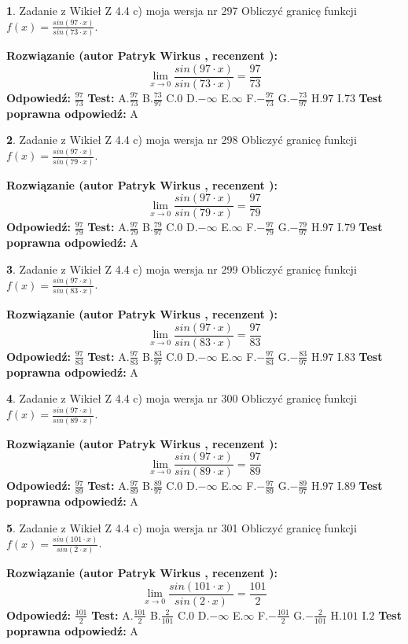 \documentclass[12pt, a4paper]{article}
\theoremstyle{definition} %
\newtheorem{zad}{}
\newcommand{\zadStart}[1]{\begin{zad}#1\newline}
\newcommand{\zadStop}{\end{zad}}
\newcommand{\rozwStart}[2]{\noindent \textbf{Rozwiązanie (autor #1 , recenzent #2): }\newline}
\newcommand{\rozwStop}{\newline}
\newcommand{\odpStart}{\noindent \textbf{Odpowiedź:}\newline}
\newcommand{\odpStop}{\newline}
\newcommand{\testStart}{\noindent \textbf{Test:}\newline}
\newcommand{\testStop}{\newline}
\newcommand{\kluczStart}{\noindent \textbf{Test poprawna odpowiedź:}\newline}
\newcommand{\kluczStop}{\newline}
\begin{document}
\zadStart{Zadanie z Wikieł Z 4.4 c) moja wersja nr 297}
Obliczyć granicę funkcji $f(x)=\frac{sin(97\cdot x)}{sin(73\cdot x)}$.
\zadStop
\rozwStart{Patryk Wirkus}{}
$$\lim\limits_{x\to 0}\frac{sin(97\cdot x)}{sin(73\cdot x)}=
\frac{97}{73}$$
\rozwStop
\odpStart
$\frac{97}{73}$
\odpStop
\testStart
A.$\frac{97}{73}$
B.$\frac{73}{97}$
C.$0$
D.$-\infty$
E.$\infty$
F.$-\frac{97}{73}$
G.$-\frac{73}{97}$
H.$97$
I.$73$
\testStop
\kluczStart
A
\kluczStop



\zadStart{Zadanie z Wikieł Z 4.4 c) moja wersja nr 298}
Obliczyć granicę funkcji $f(x)=\frac{sin(97\cdot x)}{sin(79\cdot x)}$.
\zadStop
\rozwStart{Patryk Wirkus}{}
$$\lim\limits_{x\to 0}\frac{sin(97\cdot x)}{sin(79\cdot x)}=
\frac{97}{79}$$
\rozwStop
\odpStart
$\frac{97}{79}$
\odpStop
\testStart
A.$\frac{97}{79}$
B.$\frac{79}{97}$
C.$0$
D.$-\infty$
E.$\infty$
F.$-\frac{97}{79}$
G.$-\frac{79}{97}$
H.$97$
I.$79$
\testStop
\kluczStart
A
\kluczStop



\zadStart{Zadanie z Wikieł Z 4.4 c) moja wersja nr 299}
Obliczyć granicę funkcji $f(x)=\frac{sin(97\cdot x)}{sin(83\cdot x)}$.
\zadStop
\rozwStart{Patryk Wirkus}{}
$$\lim\limits_{x\to 0}\frac{sin(97\cdot x)}{sin(83\cdot x)}=
\frac{97}{83}$$
\rozwStop
\odpStart
$\frac{97}{83}$
\odpStop
\testStart
A.$\frac{97}{83}$
B.$\frac{83}{97}$
C.$0$
D.$-\infty$
E.$\infty$
F.$-\frac{97}{83}$
G.$-\frac{83}{97}$
H.$97$
I.$83$
\testStop
\kluczStart
A
\kluczStop



\zadStart{Zadanie z Wikieł Z 4.4 c) moja wersja nr 300}
Obliczyć granicę funkcji $f(x)=\frac{sin(97\cdot x)}{sin(89\cdot x)}$.
\zadStop
\rozwStart{Patryk Wirkus}{}
$$\lim\limits_{x\to 0}\frac{sin(97\cdot x)}{sin(89\cdot x)}=
\frac{97}{89}$$
\rozwStop
\odpStart
$\frac{97}{89}$
\odpStop
\testStart
A.$\frac{97}{89}$
B.$\frac{89}{97}$
C.$0$
D.$-\infty$
E.$\infty$
F.$-\frac{97}{89}$
G.$-\frac{89}{97}$
H.$97$
I.$89$
\testStop
\kluczStart
A
\kluczStop



\zadStart{Zadanie z Wikieł Z 4.4 c) moja wersja nr 301}
Obliczyć granicę funkcji $f(x)=\frac{sin(101\cdot x)}{sin(2\cdot x)}$.
\zadStop
\rozwStart{Patryk Wirkus}{}
$$\lim\limits_{x\to 0}\frac{sin(101\cdot x)}{sin(2\cdot x)}=
\frac{101}{2}$$
\rozwStop
\odpStart
$\frac{101}{2}$
\odpStop
\testStart
A.$\frac{101}{2}$
B.$\frac{2}{101}$
C.$0$
D.$-\infty$
E.$\infty$
F.$-\frac{101}{2}$
G.$-\frac{2}{101}$
H.$101$
I.$2$
\testStop
\kluczStart
A
\kluczStop
\end{document}
